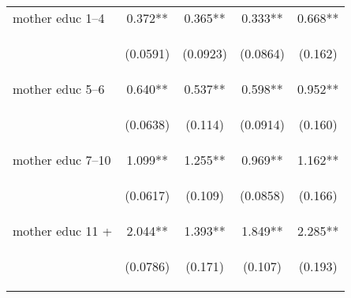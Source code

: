 \documentclass{article}[11pt,subeqn]
\begin{document}
\begin{spacing}{1.5}
\begin{table}[htpb!]
\begin{center}
\begin{tabular}{lcccc}
mother educ 1--4 & 0.372** & 0.365** & 0.333** & 0.668** \\
\vspace{4pt} & \begin{footnotesize}(0.0591)\end{footnotesize} & \begin{footnotesize}(0.0923)\end{footnotesize} & \begin{footnotesize}(0.0864)\end{footnotesize} & \begin{footnotesize}(0.162)\end{footnotesize} \\
mother educ 5--6 & 0.640** & 0.537** & 0.598** & 0.952** \\
\vspace{4pt} & \begin{footnotesize}(0.0638)\end{footnotesize} & \begin{footnotesize}(0.114)\end{footnotesize} & \begin{footnotesize}(0.0914)\end{footnotesize} & \begin{footnotesize}(0.160)\end{footnotesize} \\
mother educ 7--10 & 1.099** & 1.255** & 0.969** & 1.162** \\
\vspace{4pt} & \begin{footnotesize}(0.0617)\end{footnotesize} & \begin{footnotesize}(0.109)\end{footnotesize} & \begin{footnotesize}(0.0858)\end{footnotesize} & \begin{footnotesize}(0.166)\end{footnotesize} \\
mother educ 11 + & 2.044** & 1.393** & 1.849** & 2.285** \\
\vspace{4pt} & \begin{footnotesize}(0.0786)\end{footnotesize} & \begin{footnotesize}(0.171)\end{footnotesize} & \begin{footnotesize}(0.107)\end{footnotesize} & \begin{footnotesize}(0.193)\end{footnotesize} \\

\end{tabular}
\end{center}
\end{table}
\end{spacing}
\end{document}
